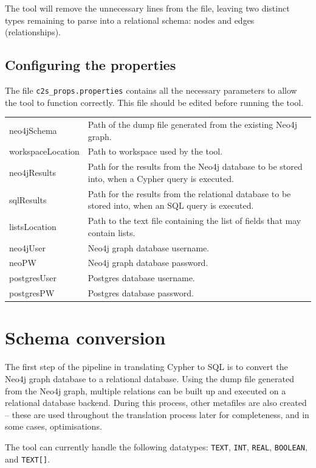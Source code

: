 \documentclass[letterpaper]{ltxdoc}
\begin{document}
The tool will remove the unnecessary lines from the file, leaving two distinct types remaining to parse into a relational schema: nodes and edges (relationships).


\subsection{Configuring the properties}
\label{ss:prop}
The file \texttt{c2s\_props.properties} contains all the necessary parameters to allow the tool to function correctly. This file should be edited before running the tool.

\begin{center}
\begin{tabular}{ p{3cm} p{10.5cm} }
neo4jSchema & Path of the dump file generated from the existing Neo4j graph. \\
workspaceLocation & Path to workspace used by the tool. \\
neo4jResults & Path for the results from the Neo4j database to be stored into, when a Cypher query is executed. \\
sqlResults & Path for the results from the relational database to be stored into, when an SQL query is executed. \\
listsLocation & Path to the text file containing the list of fields that may contain lists. \\
neo4jUser & Neo4j graph database username. \\
neoPW & Neo4j graph database password. \\
postgresUser & Postgres database username. \\
postgresPW & Postgres database password. \\
\end{tabular}
\end{center}


\section{Schema conversion}
\label{sec:schemaConv}
The first step of the pipeline in translating Cypher to SQL is to convert the Neo4j graph database to a relational database. Using the dump file generated from the Neo4j graph, multiple relations can be built up and executed on a relational database backend. During this process, other metafiles are also created -- these are used throughout the translation process later for completeness, and in some cases, optimisations.

The tool can currently handle the following datatypes: \texttt{TEXT}, \texttt{INT}, \texttt{REAL}, \texttt{BOOLEAN}, and \texttt{TEXT[]}.
\end{document}
